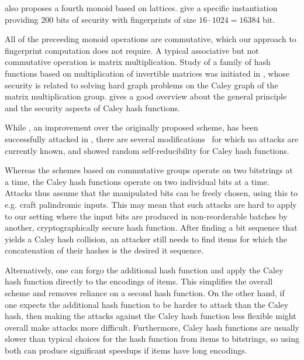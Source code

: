 \cite{bellare1997new} also proposes a fourth monoid based on lattices. \cite{lewi2019securing} give a specific instantiation providing 200 bits of security with fingerprints of size $16 \cdot 1024 = 16384$ bit.

All of the preceeding monoid operations are commutative, which our approach to fingerprint computation does not require. A typical associative but not commutative operation is matrix multiplication. Study of a family of hash functions based on multiplication of invertible matrices was initiated in \cite{zemor1991hash}, whose security is related to solving hard graph problems on the Caley graph of the matrix multiplication group. \cite{petit2011rubik} gives a good overview about the general principle and the security aspects of Caley hash functions.

While \cite{tillich1994hashing}, an improvement over the originally proposed scheme, has been successfully attacked in \cite{grassl2011cryptanalysis}\cite{petit2010preimages}, there are several modifications~\cite{petit2009graph}\cite{bromberg2017navigating}\cite{sosnovski2016cayley} for which no attacks are currently known, and \cite{mullan2016text} showed random self-reducibility for Caley hash functions.

Whereas the schemes based on commutative groups operate on two bitstrings at a time, the Caley hash functions operate on two individual bits at a time. Attacks thus assume that the manipulated bits can be freely chosen, using this to e.g. craft palindromic inputs. This may mean that such attacks are hard to apply to our setting where the input bits are produced in non-reorderable batches by another, cryptographically secure hash function. After finding a bit sequence that yields a Caley hash collision, an attacker still needs to find items for which the concatenation of their hashes is the desired it sequence.

Alternatively, one can forgo the additional hash function and apply the Caley hash function directly to the encodings of items. This simplifies the overall scheme and removes reliance on a second hash function. On the other hand, if one expects the additional hash function to be harder to attack than the Caley hash, then making the attacks against the Caley hash function less flexible might overall make attacks more difficult. Furthermore, Caley hash functions are usually slower than typical choices for the hash function from items to bitstrings, so using both can produce significant speedups if items have long encodings.

